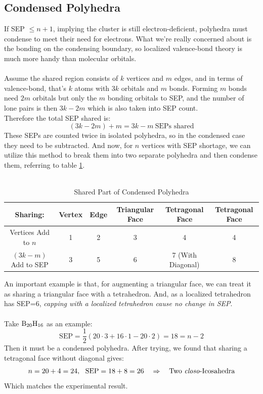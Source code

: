 \subsection{Condensed Polyhedra}
If SEP $\leq n+1$, implying the cluster is still electron-deficient, polyhedra must condense to meet their need for electrons.
What we're really concerned about is the bonding on the condensing boundary, 
so localized valence-bond theory is much more handy than molecular orbitals.\\ \\
Assume the shared region consists of $k$ vertices and $m$ edges, 
and in terms of valence-bond, that's $k$ atoms with $3k$ orbitals and $m$ bonds.
Forming $m$ bonds need $2m$ orbitals but only the $m$ bonding orbitals to SEP, 
and the number of lone pairs is then $3k-2m$ which is also taken into SEP count.\\
Therefore the total SEP shared is:
\[(3k-2m)+m=3k-m\ \text{SEPs shared}\]
These SEPs are counted twice in isolated polyhedra, so in the condensed case they need to be subtracted.
And now, for $n$ vertices with SEP shortage, we can utilize this method to break them into two separate polyhedra and then condense them, 
referring to table \ref{condense}.\\ \\
\begin{table}
\centering
\begin{tabular}{|*6{c|}}
\hline
Sharing: & Vertex & Edge & Triangular Face & Tetragonal Face & Tetragonal Face  \\
\hline
Vertices Add to $n$ & 1 & 2 & 3 & 4 & 4\\
$(3k-m)$ Add to SEP& 3 & 5 & 6 & 7 (With Diagonal) & 8\\
\hline
\end{tabular}
\caption{Shared Part of Condensed Polyhedra}
\label{condense}
\end{table}
An important example is that, for augmenting a triangular face, we can treat it as sharing a triangular face with a tetrahedron.
And, as a localized tetrahedron has SEP=6, \emph{capping with a localized tetrahedron cause no change in SEP}.\\ \\
Take $\rm B_{20}H_{16}$ as an example:
\[\text{SEP} = \frac{1}{2}(20\cdot3+16\cdot1-20\cdot2)=18=n-2\]
Then it must be a condensed polyhedra. After trying, we found that sharing a tetragonal face without diagonal gives:\\
\[n=20+4=24,\ \text{ SEP}=18+8=26\quad\Rightarrow\quad\text{Two \emph{closo}-Icosahedra}\]
Which matches the experimental result.
